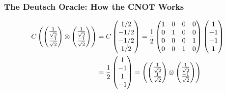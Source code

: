 \documentclass{beamer}
\begin{document}
\begin{frame}
\frametitle{The Deutsch Oracle: How the CNOT Works}

\begin{align*}
    C \left(\begin{pmatrix}{1 \over \sqrt{2}} \\{-1 \over \sqrt{2}}\end{pmatrix}
        \otimes \begin{pmatrix}{1 \over \sqrt{2}} \\{-1 \over \sqrt{2}}\end{pmatrix}\right)
    &= C \begin{pmatrix}1/2 \\ -1/2 \\ -1/2 \\ 1/2 \end{pmatrix}
    = {1 \over 2}
        \begin{pmatrix}
        1 & 0 & 0 & 0 \\
        0 & 1 & 0 & 0 \\
        0 & 0 & 0 & 1 \\
        0 & 0 & 1 & 0 \\
        \end{pmatrix}
        \begin{pmatrix}1 \\ -1 \\ -1 \\ 1 \end{pmatrix}\\
    &= {1 \over 2}
        \begin{pmatrix}1 \\ -1 \\ 1 \\ -1 \end{pmatrix}
    = \left(\begin{pmatrix}{1 \over \sqrt{2}} \\{1 \over \sqrt{2}}\end{pmatrix}
        \otimes \begin{pmatrix}{1 \over \sqrt{2}} \\{-1 \over \sqrt{2}}\end{pmatrix}\right)
\end{align*}

\end{frame}
\end{document}

